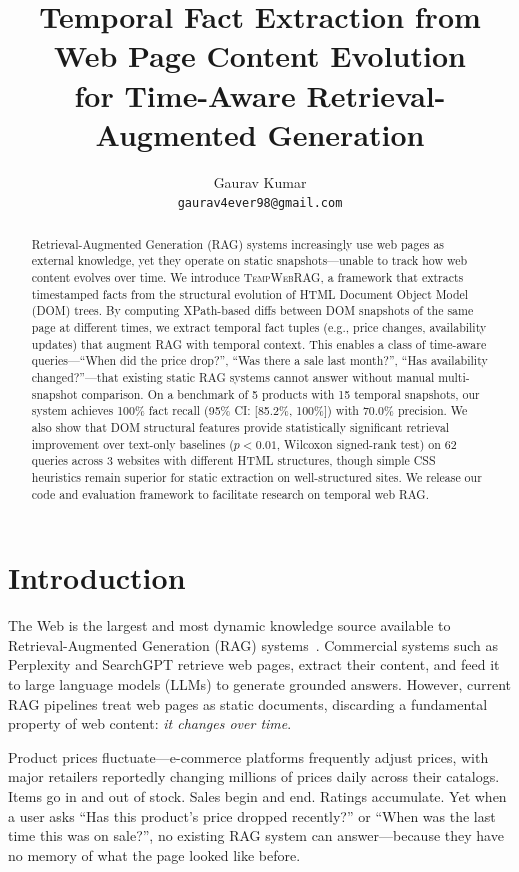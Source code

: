 \documentclass[11pt]{article}
\title{Temporal Fact Extraction from Web Page Content Evolution \\
for Time-Aware Retrieval-Augmented Generation}
\author{
  Gaurav Kumar \\
  \texttt{gaurav4ever98@gmail.com}
}
\date{}
\newcommand{\ours}{\textsc{TempWebRAG}}
\begin{document}
\maketitle

\begin{abstract}
Retrieval-Augmented Generation (RAG) systems increasingly use web pages as external knowledge, yet they operate on static snapshots---unable to track how web content evolves over time. We introduce \ours{}, a framework that extracts timestamped facts from the structural evolution of HTML Document Object Model (DOM) trees. By computing XPath-based diffs between DOM snapshots of the same page at different times, we extract temporal fact tuples (e.g., price changes, availability updates) that augment RAG with temporal context. This enables a class of time-aware queries---``When did the price drop?'', ``Was there a sale last month?'', ``Has availability changed?''---that existing static RAG systems cannot answer without manual multi-snapshot comparison. On a benchmark of 5 products with 15 temporal snapshots, our system achieves 100\% fact recall (95\% CI: [85.2\%, 100\%]) with 70.0\% precision. We also show that DOM structural features provide statistically significant retrieval improvement over text-only baselines ($p < 0.01$, Wilcoxon signed-rank test) on 62 queries across 3 websites with different HTML structures, though simple CSS heuristics remain superior for static extraction on well-structured sites. We release our code and evaluation framework to facilitate research on temporal web RAG.
\end{abstract}

\section{Introduction}
\label{sec:intro}

The Web is the largest and most dynamic knowledge source available to Retrieval-Augmented Generation (RAG) systems~\cite{lewis2020rag,htmlrag2025,rag_survey2025}. Commercial systems such as Perplexity and SearchGPT retrieve web pages, extract their content, and feed it to large language models (LLMs) to generate grounded answers. However, current RAG pipelines treat web pages as static documents, discarding a fundamental property of web content: \emph{it changes over time}.

Product prices fluctuate---e-commerce platforms frequently adjust prices, with major retailers reportedly changing millions of prices daily across their catalogs. Items go in and out of stock. Sales begin and end. Ratings accumulate. Yet when a user asks ``Has this product's price dropped recently?'' or ``When was the last time this was on sale?'', no existing RAG system can answer---because they have no memory of what the page looked like before.
\end{document}
